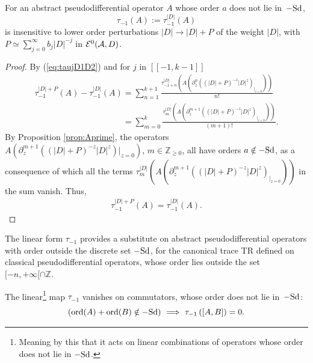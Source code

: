 \documentclass[pdftex]{sigma}
\def \Z {\mathbb Z}
\numberwithin{equation}{section}
\begin{document}
\begin{proposition}\label{proposition6}   For  an abstract pseudodifferential  operator $A$ whose order
  $a$ does not lie in~$-{\rm Sd}$,
\[
\tau_{-1}(A):=\tau_{-1}^{\vert D\vert} (A)
\] is insensitive to lower
order perturbations $\vert D\vert\to \vert D\vert +P$ of the weight
 $\vert D\vert$,  with $P\simeq \sum\limits_{j=0}^\infty b_j   \vert D\vert^{-j}
 $ in  ${\cal E}^0({\cal A}, D)$.
\end{proposition}
\begin{proof}
By (\ref{eq:taujD1D2}) and for $j$ in $[[-1, k-1]]$
\begin{gather*}
 \tau_{-1}^{\vert D\vert +P}(A)-\tau_{-1}^{\vert D\vert}(A) =  \sum_{n=1}^{k+1}
\frac{\tau_{-1+n}^{\vert D\vert}\left( A \left(\partial_z^n((\vert D\vert +P)^{-z} \vert
    D\vert^z)_{\vert_{z=0}}\right)\right)}{n!}\\
\phantom{\tau_{-1}^{\vert D\vert +P}(A)-\tau_{-1}^{\vert D\vert}(A)}{}
 =  \sum_{m= 0}^k
\frac{\tau_{m}^{\vert D\vert}\left( A \left(\partial_z^{m+1}((\vert D\vert+P)^{-z} \vert
    D\vert^z)_{\vert_{z=0}}\right)\right)}{(m+1)!}.
\end{gather*}
By Proposition \ref{prop:Aprime}, the operators  $ A \left(\partial_z^{m+1}((\vert D\vert+P)^{-z} \vert
    D\vert^z)\vert_{z=0}\right)$, $m\in \Z_{\geq 0}$, all  have orders $a\notin -{\rm Sd}$, as a consequence
  of which
   all the terms $\tau_{m}^{\vert D\vert}\left( A \left(\partial_z^{m+1}((\vert D\vert+P)^{-z} \vert
    D\vert^z)_{\vert_{z=0}}\right)\right)$  in the sum
vanish. Thus,
\begin{gather*}
\tau_{-1}^{\vert D\vert +P}(A)=\tau_{-1}^{\vert D\vert}(A).\tag*{\qed}
\end{gather*}\renewcommand{\qed}{}
\end{proof}

The linear form $\tau_{-1}$  provides a substitute on
abstract pseudodif\/ferential operators with order outside the discrete set $-{\rm Sd}$, for the canonical trace TR
def\/ined on classical pseudodif\/ferential
operators, whose order lies outside  the set $[{-}n,+\infty[\cap \Z$.
\begin{proposition}\label{proposition7}
The linear\footnote{Meaning by this that it acts on  linear
  combinations of operators whose order does not lie in $-{\rm Sd}$.}  map
$\tau_{-1}$  vanishes on  commutators, whose order does not  lie in~$-{\rm Sd}$:
\[
\left({\rm ord}(A)+{\rm ord}(B)\notin -{\rm Sd}\right) \ \Longrightarrow \
\tau_{-1}\left([A,B]\right)=0.
\]
\end{proposition}
\end{document}
